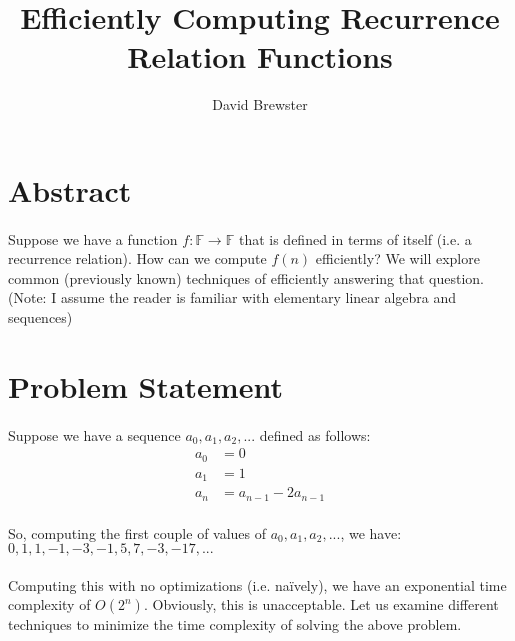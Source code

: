 \documentclass{article}
\title{Efficiently Computing Recurrence Relation Functions}
\author{David Brewster}
\begin{document}
    \maketitle

    \section{Abstract}
    	\paragraph{}
        	Suppose we have a function $f: \mathbb{F} \rightarrow \mathbb{F}$ that is defined in terms of itself 
            (i.e. a recurrence relation). 
            How can we compute $f(n)$ efficiently? We will explore common (previously known) techniques of efficiently answering that question.
            (Note: I assume the reader is familiar with elementary linear algebra and sequences)
   
    \section{Problem Statement}
   		\paragraph{}
        	Suppose we have a sequence $a_0, a_1, a_2, ...$ defined as follows:
            \begin{align*}
            	a_0 &= 0\\
                a_1 &= 1\\ 
                a_n &= a_{n-1} - 2a_{n-1}\\
            \end{align*}
            \begin{center}
                So, computing the first couple of values of $a_0, a_1, a_2, ...$, we have:\\
                $0, 1, 1, -1, -3, -1, 5, 7, -3, -17, ...$
            \end{center}
            
        \paragraph{}
            Computing this with no optimizations (i.e. naïvely), we have an exponential time complexity of $O(2^n)$.
            Obviously, this is unacceptable.
            Let us examine different techniques to minimize the time complexity of solving the above problem.
      
\end{document}
